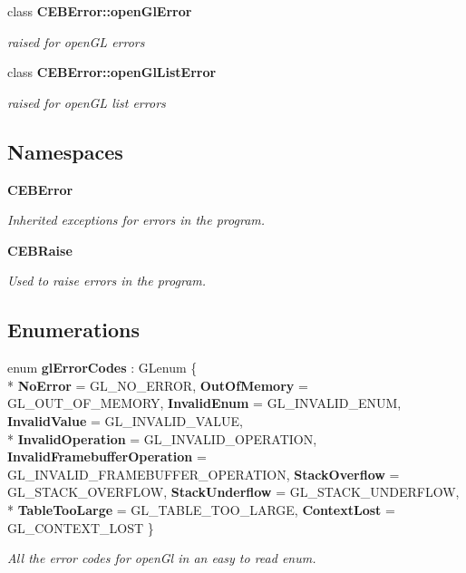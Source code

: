 \begin{DoxyCompactItemize}
class {\bf C\-E\-B\-Error\-::open\-Gl\-Error}
\begin{DoxyCompactList}\small\item\em raised for open\-G\-L errors \end{DoxyCompactList}\item 
class {\bf C\-E\-B\-Error\-::open\-Gl\-List\-Error}
\begin{DoxyCompactList}\small\item\em raised for open\-G\-L list errors \end{DoxyCompactList}\end{DoxyCompactItemize}
\subsection*{Namespaces}
\begin{DoxyCompactItemize}
\item 
{\bf C\-E\-B\-Error}
\begin{DoxyCompactList}\small\item\em Inherited exceptions for errors in the program. \end{DoxyCompactList}\item 
{\bf C\-E\-B\-Raise}
\begin{DoxyCompactList}\small\item\em Used to raise errors in the program. \end{DoxyCompactList}\end{DoxyCompactItemize}
\subsection*{Enumerations}
\begin{DoxyCompactItemize}
\item 
enum {\bf gl\-Error\-Codes} \-: G\-Lenum \{ \\*
{\bf No\-Error} = G\-L\-\_\-\-N\-O\-\_\-\-E\-R\-R\-O\-R, 
{\bf Out\-Of\-Memory} = G\-L\-\_\-\-O\-U\-T\-\_\-\-O\-F\-\_\-\-M\-E\-M\-O\-R\-Y, 
{\bf Invalid\-Enum} = G\-L\-\_\-\-I\-N\-V\-A\-L\-I\-D\-\_\-\-E\-N\-U\-M, 
{\bf Invalid\-Value} = G\-L\-\_\-\-I\-N\-V\-A\-L\-I\-D\-\_\-\-V\-A\-L\-U\-E, 
\\*
{\bf Invalid\-Operation} = G\-L\-\_\-\-I\-N\-V\-A\-L\-I\-D\-\_\-\-O\-P\-E\-R\-A\-T\-I\-O\-N, 
{\bf Invalid\-Framebuffer\-Operation} = G\-L\-\_\-\-I\-N\-V\-A\-L\-I\-D\-\_\-\-F\-R\-A\-M\-E\-B\-U\-F\-F\-E\-R\-\_\-\-O\-P\-E\-R\-A\-T\-I\-O\-N, 
{\bf Stack\-Overflow} = G\-L\-\_\-\-S\-T\-A\-C\-K\-\_\-\-O\-V\-E\-R\-F\-L\-O\-W, 
{\bf Stack\-Underflow} = G\-L\-\_\-\-S\-T\-A\-C\-K\-\_\-\-U\-N\-D\-E\-R\-F\-L\-O\-W, 
\\*
{\bf Table\-Too\-Large} = G\-L\-\_\-\-T\-A\-B\-L\-E\-\_\-\-T\-O\-O\-\_\-\-L\-A\-R\-G\-E, 
{\bf Context\-Lost} = G\-L\-\_\-\-C\-O\-N\-T\-E\-X\-T\-\_\-\-L\-O\-S\-T
 \}
\begin{DoxyCompactList}\small\item\em All the error codes for open\-Gl in an easy to read enum. \end{DoxyCompactList}\end{DoxyCompactItemize}

